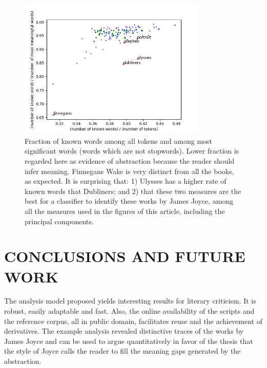 \documentclass[12pt,fleqn]{article}
\begin{document}
\begin{figure}[!htbp] %
\vspace{-2pt}
\begin{center}
\includegraphics[height=6.7cm,width=9cm]{figs/abst2}%
    \caption{Fraction of known words among all tokens and among most significant words (words which are not stopwords).
    Lower fraction is regarded here as evidence of abstraction because the reader should infer meaning.
    Finnegans Wake is very distinct from all the books, as expected.
    It is surprising that: 1) Ulysses has a higher rate of known words that Dubliners;
    and 2) that these two measures are the best for a classifier to identify these works by James Joyce, among all the measures used in the figures of this article, including the principal components.}
\label{fig:abst2}%
\end{center}
\end{figure}

\section{CONCLUSIONS AND FUTURE WORK}\label{sec:conc}
The analysis model proposed yields interesting results for literary criticism.
It is robust, easily adaptable and fast.
Also, the online availability of the scripts and the reference corpus,
all in public domain, facilitates reuse and the achievement of derivatives.
The example analysis
revealed distinctive traces of the works by James Joyce and can be used to argue quantitatively
in favor of the thesis that the style of Joyce calls the reader to fill the
meaning gaps generated by the abstraction.
\end{document}
